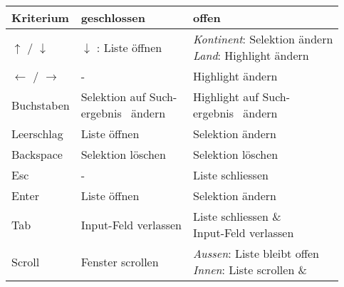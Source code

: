 \begin{table}[!htb]
    \label{table:interactionCountryInput}
    \footnotesize
    \begin{adjustbox}{max width=\textwidth}
        \begin{threeparttable}
            \begin{tabular}{ l || l | l }
                \bf{Kriterium}    & \bf{geschlossen} & \bf{offen} \\
                \hline \hline
                $\uparrow$ / $\downarrow$    & $\downarrow$ : Liste öffnen & \tbbr{\emph{Kontinent}: Selektion ändern \\ 
                                                                                   \emph{Land}: Highlight ändern}  \\
                \hline
                $\leftarrow$ / $\rightarrow$ & -                           & Highlight ändern                         \\
                \hline
                Buchstaben & \tbbr{Selektion auf Such-\\ 
                                   ergebnis\tnote{1} \ ändern}             & \tbbr{Highlight auf Such-\\ 
                                                                                   ergebnis\tnote{1} \ ändern}        \\
                \hline
                Leerschlag & Liste öffnen          & Selektion ändern  \\
                \hline
                Backspace  & Selektion löschen     & Selektion löschen \\
                \hline
                Esc        & -                     & Liste schliessen  \\
                \hline \hline
                Enter      & Liste öffnen          & Selektion ändern  \\
                \hline
                Tab        & Input-Feld verlassen  & \tbbr{Liste schliessen \& \\ 
                                                           Input-Feld verlassen }                 \\
                \hline \hline
                Scroll     & Fenster scrollen      & \tbbr{\emph{Aussen}: Liste bleibt offen \\
                                                           \emph{Innen}: Liste scrollen \& \\ 
}
\end{tabular}
\end{threeparttable}
\end{adjustbox}
\end{table}
